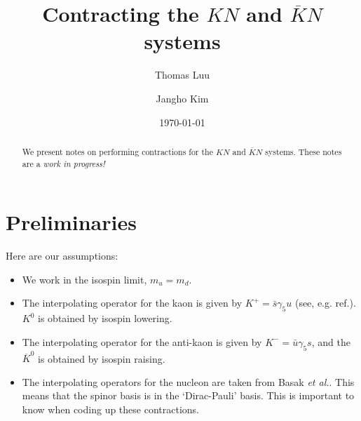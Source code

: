 \documentclass[%
 preprint,
nofootinbib,
 amsmath,amssymb,
 aps,
]{revtex4-2}
\begin{document}

\title{Contracting the $KN$ and $\overline{K}N$ systems}
\author{Thomas Luu}

\author{Jangho Kim}

\date{\today}%

\begin{abstract}
We present notes on performing contractions for the $KN$ and $\overline{K}N$ systems.  These notes are a \emph{work in progress!}  
\end{abstract}

\maketitle


\thispagestyle{fancy}

\clearpage{}

\section{Preliminaries}
Here are our assumptions:
\begin{itemize}
\item We work in the isospin limit, $m_u=m_d$.
\item The interpolating operator for the kaon is given by $K^+=\bar{s}\gamma_5 u$ (see, e.g. ref.\cite{Gattringer:2010zz}).  $K^0$ is obtained by isospin lowering.
\item The interpolating operator for the anti-kaon is given by $K^-=\bar{u}\gamma_5s$, and the $\overline{K}^0$ is obtained by isospin raising.
\item The interpolating operators for the nucleon are taken from Basak \emph{et al.}\cite{Basak:2005ir}.  This means that the spinor basis is in the `Dirac-Pauli' basis.  This is important to know when coding up these contractions.
\end{itemize}
\end{document}
